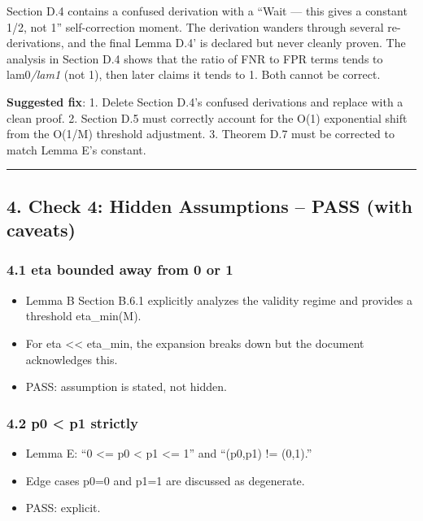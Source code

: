 \documentclass[
  12pt,
]{article}
\providecommand{\tightlist}{%
  \setlength{\itemsep}{0pt}\setlength{\parskip}{0pt}}
\begin{document}
Section D.4 contains a confused derivation with a ``Wait --- this gives
a constant 1/2, not 1'' self-correction moment. The derivation wanders
through several re-derivations, and the final Lemma D.4' is declared but
never cleanly proven. The analysis in Section D.4 shows that the ratio
of FNR to FPR terms tends to lam0\emph{/\textbar lam1}\textbar{} (not
1), then later claims it tends to 1. Both cannot be correct.

\textbf{Suggested fix}: 1. Delete Section D.4's confused derivations and
replace with a clean proof. 2. Section D.5 must correctly account for
the O(1) exponential shift from the O(1/M) threshold adjustment. 3.
Theorem D.7 must be corrected to match Lemma E's constant.

\begin{center}\rule{0.5\linewidth}{0.5pt}\end{center}

\subsection{4. Check 4: Hidden Assumptions -- PASS (with
caveats)}\label{check-4-hidden-assumptions-pass-with-caveats}

\subsubsection{4.1 eta bounded away from 0 or
1}\label{eta-bounded-away-from-0-or-1}

\begin{itemize}
\tightlist
\item
  Lemma B Section B.6.1 explicitly analyzes the validity regime and
  provides a threshold eta\_min(M).
\item
  For eta \textless\textless{} eta\_min, the expansion breaks down but
  the document acknowledges this.
\item
  PASS: assumption is stated, not hidden.
\end{itemize}

\subsubsection{4.2 p0 \textless{} p1 strictly}\label{p0-p1-strictly}

\begin{itemize}
\tightlist
\item
  Lemma E: ``0 \textless= p0 \textless{} p1 \textless= 1'' and ``(p0,p1)
  != (0,1).''
\item
  Edge cases p0=0 and p1=1 are discussed as degenerate.
\item
  PASS: explicit.
\end{itemize}
\end{document}
